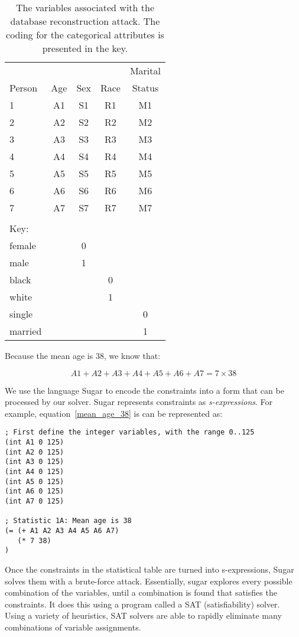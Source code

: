 \documentclass[runningheads]{llncs}
\begin{document}
\begin{table}
\caption{The variables associated with the database reconstruction
  attack. The coding for the categorical attributes is presented in the key.}\label{variables}
\begin{center}
\begin{tabular}{l|cccc}
       &     &     &      & Marital  \\
Person & Age & Sex & Race & Status   \\
\hline                             
1      & A1  & S1  & R1   & M1       \\
2      & A2  & S2  & R2   & M2       \\
3      & A3  & S3  & R3   & M3       \\
4      & A4  & S4  & R4   & M4       \\
5      & A5  & S5  & R5   & M5       \\
6      & A6  & S6  & R6   & M6       \\
7      & A7  & S7  & R7   & M7       \\
\hline
\multicolumn{1}{l}{}\\
\multicolumn{1}{l}{Key:}\\
\hline
female &     &  0  & \\
male   &     &  1  & \\
\hline
black  &     &     &  0   & \\
white  &     &     &  1   & \\
\hline
single &     &     &      &   0\\
married&     &     &      &   1\\
\hline
\end{tabular}
\end{center}
\end{table}

Because the mean age is 38, we know that:

\begin{equation}
A1 + A2 + A3 + A4 + A5 + A6 + A7 = 7 \times 38
\label{mean_age_38}
\end{equation}

We use the language Sugar\cite{sugar} to encode the constraints
into a form that can be processed by our solver. Sugar represents
constraints as
\textit{s-expressions}\cite{McCarthy:1960:RFS:367177.367199}. For
example, equation~\ref{mean_age_38} is can be represented as:

\begin{Verbatim}
; First define the integer variables, with the range 0..125
(int A1 0 125)
(int A2 0 125)
(int A3 0 125)
(int A4 0 125)
(int A5 0 125)
(int A6 0 125)
(int A7 0 125)

; Statistic 1A: Mean age is 38
(= (+ A1 A2 A3 A4 A5 A6 A7)
   (* 7 38)
)
\end{Verbatim}
Once the constraints in the statistical table are turned into
s-expressions, Sugar solves them with a brute-force attack.
Essentially, sugar explores every possible combination of the variables,
until a combination is found that satisfies the constraints. It does
this using a program called a SAT (satisfiability) solver. Using a
variety of heuristics, SAT solvers are able to rapidly eliminate many
combinations of variable assignments.
\end{document}
